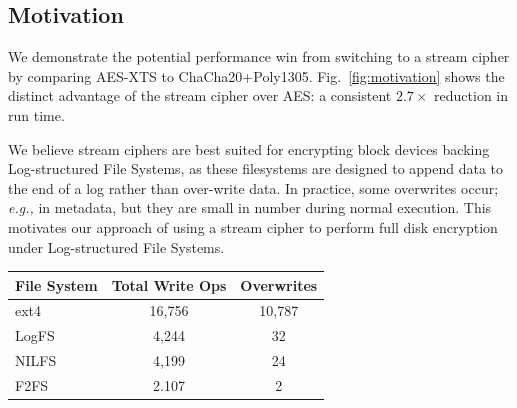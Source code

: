 \documentclass[a0,portrait]{a0poster}
\renewcommand{\footnotesize}{\fontsize{20.74}{25}\selectfont}
\newcommand{\eg}{\textit{e.g., }}
\newcommand{\PAD}{\vskip 0.75cm}
\newcommand{\figref}[1]{Fig.~\ref{fig:#1}}
\begin{document}
\begin{multicols}{2}
\color{SaddleBrown} %

\section*{Motivation}

We demonstrate the potential performance win from switching to a stream cipher
by comparing AES-XTS to ChaCha20+Poly1305. \figref{motivation} shows the
distinct advantage of the stream cipher over AES: a consistent $2.7\times$
reduction in run time.

We believe stream ciphers are best suited for encrypting block devices backing
Log-structured File Systems, as these filesystems are designed to append data to
the end of a log rather than over-write data. In practice, some overwrites
occur; \eg{in metadata}, but they are small in number during normal execution.
This motivates our approach of using a stream cipher to perform full disk
encryption under Log-structured File Systems.

\vspace{0.5cm}

\begin{minipage}{0.5\columnwidth}
\PAD 

\label{fig:motivation}
\PAD 
\end{minipage}%
\begin{minipage}{0.5\columnwidth}
\PAD 
\centering
\footnotesize
\begin{tabular}{l|c|c} 
  \textbf{File System} & \textbf{Total Write Ops} & \textbf{Overwrites}  \\
  \hline
  \hline
  ext4    &  16,756 & 10,787\\
  LogFS   &   4,244 &     32\\
  NILFS   &   4,199 &     24\\
  F2FS    &   2.107 &      2\\
  \hline 
  \hline
\end{tabular}
\label{tbl:overwrites}
\PAD 
\end{minipage}


\color{DarkSlateGray} %


\end{multicols}
\end{document}
